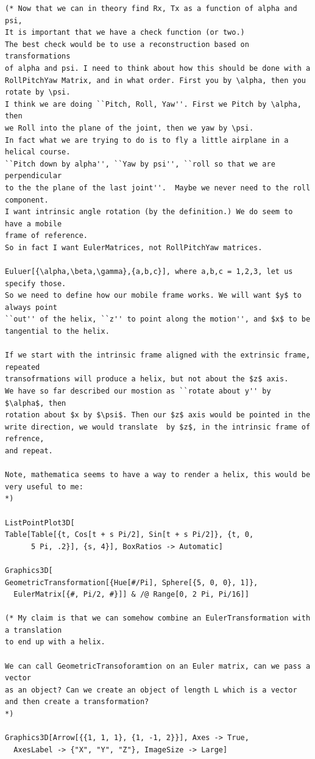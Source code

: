 \documentclass[11pt]{article}
\begin{document}
{\begin{verbatim}
(* Now that we can in theory find Rx, Tx as a function of alpha and psi,
It is important that we have a check function (or two.)
The best check would be to use a reconstruction based on transformations
of alpha and psi. I need to think about how this should be done with a
RollPitchYaw Matrix, and in what order. First you by \alpha, then you rotate by \psi.
I think we are doing ``Pitch, Roll, Yaw''. First we Pitch by \alpha, then
we Roll into the plane of the joint, then we yaw by \psi.
In fact what we are trying to do is to fly a little airplane in a helical course.
``Pitch down by alpha'', ``Yaw by psi'', ``roll so that we are perpendicular
to the the plane of the last joint''.  Maybe we never need to the roll component.
I want intrinsic angle rotation (by the definition.) We do seem to have a mobile
frame of reference.
So in fact I want EulerMatrices, not RollPitchYaw matrices.

Euluer[{\alpha,\beta,\gamma},{a,b,c}], where a,b,c = 1,2,3, let us specify those.
So we need to define how our mobile frame works. We will want $y$ to always point
``out'' of the helix, ``z'' to point along the motion'', and $x$ to be
tangential to the helix.

If we start with the intrinsic frame aligned with the extrinsic frame, repeated
transofrmations will produce a helix, but not about the $z$ axis.
We have so far described our mostion as ``rotate about y'' by $\alpha$, then
rotation about $x by $\psi$. Then our $z$ axis would be pointed in the
write direction, we would translate  by $z$, in the intrinsic frame of refrence,
and repeat.

Note, mathematica seems to have a way to render a helix, this would be very useful to me:
*)

ListPointPlot3D[
Table[Table[{t, Cos[t + s Pi/2], Sin[t + s Pi/2]}, {t, 0, 
      5 Pi, .2}], {s, 4}], BoxRatios -> Automatic]

Graphics3D[
GeometricTransformation[{Hue[#/Pi], Sphere[{5, 0, 0}, 1]}, 
  EulerMatrix[{#, Pi/2, #}]] & /@ Range[0, 2 Pi, Pi/16]]

(* My claim is that we can somehow combine an EulerTransformation with a translation
to end up with a helix.

We can call GeometricTransoforamtion on an Euler matrix, can we pass a vector
as an object? Can we create an object of length L which is a vector
and then create a transformation?
*)

Graphics3D[Arrow[{{1, 1, 1}, {1, -1, 2}}], Axes -> True, 
  AxesLabel -> {"X", "Y", "Z"}, ImageSize -> Large]


\end{verbatim}}
\end{document}
